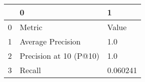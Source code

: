 \begin{tabular}{lll}
\toprule
{} &                       0 &         1 \\
\midrule
0 &                  Metric &     Value \\
1 &       Average Precision &       1.0 \\
2 &  Precision at 10 (P@10) &       1.0 \\
3 &                  Recall &  0.060241 \\
\bottomrule
\end{tabular}
